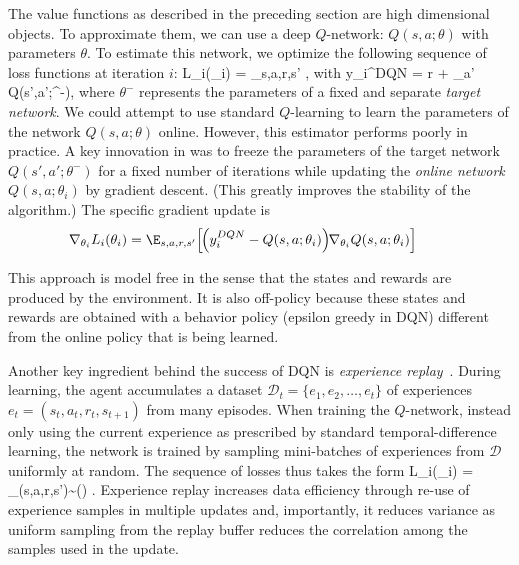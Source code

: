 The value functions as described in the preceding section are high dimensional objects. To approximate them, we can use a deep $Q$-network: $Q(s,a;\theta)$ with parameters $\theta$. To estimate this network, we optimize the following sequence of loss functions at iteration $i$:
\be
L_i(\theta_i) = \E_{s,a,r,s'} ,
\label{eq:loss}
\ee
with 
\be
y_i^{DQN} =  r + \gamma \max_{a'} Q(s',a';\theta^{-}),
\ee
where $\theta^{-}$ represents the parameters of a fixed and separate {\it target network}. %
We could attempt to use standard $Q$-learning to learn the parameters of the network $Q(s,a; \theta)$ online. However, this estimator performs poorly in practice. A key innovation in \citep{Mnih:2015} was to freeze the  parameters of the target network  $Q(s',a';\theta^{-})$ for a fixed number of iterations while updating the {\it online network} $Q(s,a; \theta_{i})$ by gradient descent. (This greatly improves the stability of the algorithm.) The specific gradient update is 
\begin{eqnarray*}
\hspace{-1.5em}&\nabla_{\theta_i} L_i(\theta_i) =
\displaystyle{\E_{s,a,r,s'}} \Big[ \hspace{-1mm}\left( y_i^{DQN} - Q(s,a; \theta_{i}) \right)\hspace{-1mm} \nabla_{\theta_i} Q(s,a; \theta_{i}) \Big]
\nonumber&
\end{eqnarray*}

This approach is model free in the sense that the states and rewards are produced by the environment. It is also off-policy because these states and rewards are obtained with a behavior policy (epsilon greedy in DQN) different from the online policy that is being learned.

Another key ingredient behind the success of DQN is  {\it experience replay}~\citep{Lin:1993,Mnih:2015}. During learning, the agent accumulates a dataset $\mathcal{D}_t =\{e_1, e_2, \ldots, e_t\}$ of experiences
$e_t=(s_t, a_t, r_t, s_{t+1})$ from many episodes. When training the $Q$-network, instead only using the current experience as prescribed by standard temporal-difference learning, the network is trained by sampling mini-batches of experiences  from $\mathcal{D}$ uniformly at random. The sequence of losses thus takes the form
\be
L_i(\theta_i) = \E_{(s,a,r,s')\sim {}() } .
\nonumber%
\ee
Experience replay increases data efficiency through re-use of experience samples in multiple updates and, importantly, it reduces variance as uniform sampling from the replay buffer reduces the correlation among the samples used in the update. 


